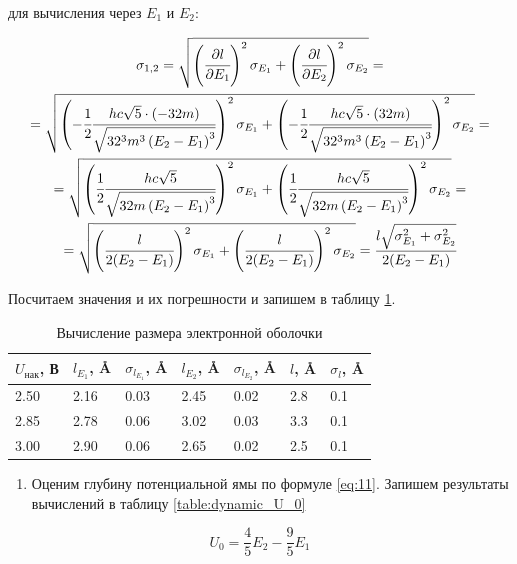 \documentclass[a4paper,12pt]{article}
\begin{document}
для вычисления через $E_1$ и $E_2$: 

\begin{multline*}
    \sigma_{1,2} = \sqrt{ \left( \cfrac{\partial l}{\partial E_1} \right)^2 \sigma_{E_1} + \left( \cfrac{\partial l}{\partial E_2} \right)^2 \sigma_{E_2} } = \\ = \sqrt{ \left( -\cfrac{1}{2} \cfrac{hc \sqrt{5} \cdot (-32m)}{\sqrt{32^3 m^3 \left(E_2 - E_1\right)^3}} \right)^2 \sigma_{E_1} + \left( -\cfrac{1}{2} \cfrac{hc \sqrt{5} \cdot (32m)}{\sqrt{32^3 m^3 \left(E_2 - E_1\right)^3}} \right)^2 \sigma_{E_2} } = \\ = \sqrt{ \left( \cfrac{1}{2} \cfrac{hc \sqrt{5}}{\sqrt{32 m \left(E_2 - E_1\right)^3}} \right)^2 \sigma_{E_1} + \left( \cfrac{1}{2} \cfrac{hc \sqrt{5}}{\sqrt{32 m \left(E_2 - E_1\right)^3}} \right)^2 \sigma_{E_2} } = \\= \sqrt{ \left( \cfrac{l}{2(E_2 - E_1)} \right)^2 \sigma_{E_1} + \left( \cfrac{l}{2(E_2 - E_1)} \right)^2 \sigma_{E_2} } = \cfrac{l\sqrt{\sigma_{E_1}^2 + \sigma_{E_2}^2}}{2(E_2 - E_1)}    
\end{multline*}

Посчитаем значения и их погрешности и запишем в таблицу \ref{table:sizes_dynamic}.


\begin{table}[h]
    \centering
    \begin{tabular}{l|ll|ll|ll}
        \hline
        $U_{\text{нак}}$, В & $l_{E_1}$, \AA & $\sigma_{l_{E_1}}$, \AA & $l_{E_2}$, \AA & $\sigma_{l_{E_2}}$, \AA & $l$, \AA & $\sigma_{l}$, \AA \\ \hline
        2.50 & 2.16 & 0.03 & 2.45 & 0.02 & 2.8 & 0.1 \\
        2.85 & 2.78 & 0.06 & 3.02 & 0.03 & 3.3 & 0.1 \\
        3.00 & 2.90 & 0.06 & 2.65 & 0.02 & 2.5 & 0.1 \\ \hline
    \end{tabular}
    \caption{Вычисление размера электронной оболочки}
    \label{table:sizes_dynamic}
\end{table}

\begin{enumerate}[resume]
    \item Оценим глубину потенциальной ямы по формуле \eqref{eq:11}. Запишем результаты вычислений в таблицу \ref{table:dynamic_U_0}
\end{enumerate}

\begin{equation*}
    U_0 = \frac{4}{5} E_2 - \frac{9}{5} E_1
\end{equation*}
\end{document}
